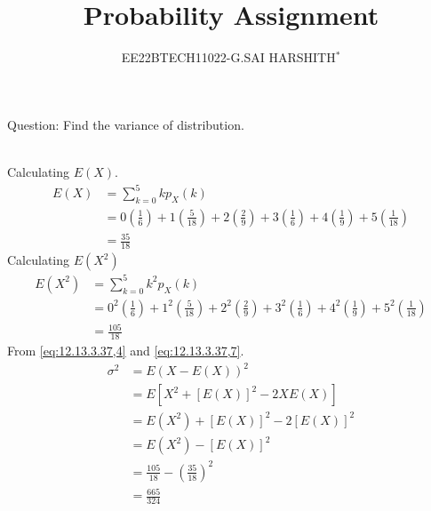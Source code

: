 \documentclass[journal,12pt,twocolumn]{IEEEtran}
\theoremstyle{remark}
\begin{document}

\vspace{3cm}

\title{Probability Assignment}
\author{EE22BTECH11022-G.SAI HARSHITH$^{*}$%
}
\maketitle
\newpage
\bigskip
\renewcommand{\thefigure}{\theenumi}
\renewcommand{\thetable}{\theenumi}

Question: Find the variance of distribution.
\begin{table}[!ht]
	
\end{table}\\
\solution
Calculating $E(X)$.
\begin{align}
E(X)&=\sum_{k=0}^{5} kp_X(k)\\
&=0\left(\frac{1}{6}\right)+1\left(\frac{5}{18}\right)+2\left(\frac{2}{9}\right)+3\left(\frac{1}{6}\right)+4\left(\frac{1}{9}\right)+5\left(\frac{1}{18}\right)\\
&=\frac{35}{18}
\label{eq:12.13.3.37,4}
\end{align}
Calculating $E(X^2)$
\begin{align}
E(X^2)&=\sum_{k=0}^{5} k^2p_X(k)\\
&=0^2\left(\frac{1}{6}\right)+1^2\left(\frac{5}{18}\right)+2^2\left(\frac{2}{9}\right)+3^2\left(\frac{1}{6}\right)+4^2\left(\frac{1}{9}\right)+5^2\left(\frac{1}{18}\right)\\
&=\frac{105}{18}
\label{eq:12.13.3.37,7}
\end{align}
From \eqref{eq:12.13.3.37,4} and \eqref{eq:12.13.3.37,7}.
\begin{align}
\sigma^2&=E(X-E(X))^2\\
&=E\left[X^2+[E(X)]^2-2XE(X)\right]\\
&=E(X^2)+[E(X)]^2-2[E(X)]^2\\
&=E(X^2)-[E(X)]^2\\
&=\frac{105}{18}-\left(\frac{35}{18}\right)^2\\
&=\frac{665}{324}
\end{align}
\end{document}

